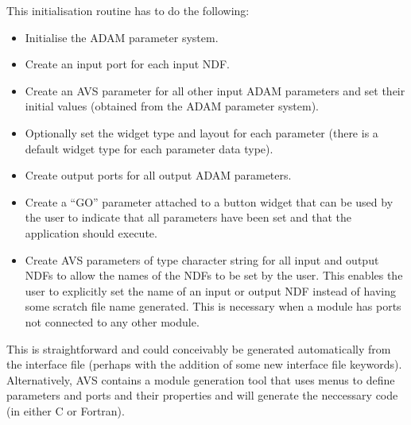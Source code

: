 This initialisation routine has to do the following:
\begin{itemize}

\item Initialise the ADAM parameter system.

\item Create an input port for each input NDF.

\item Create an AVS parameter for all other input ADAM parameters and set their
  initial values (obtained from the ADAM parameter system).

\item Optionally set the widget type and layout for each parameter (there is a
  default widget type for each parameter data type).

\item Create output ports for all output ADAM parameters.

\item Create a ``GO'' parameter attached to a button widget that can be used by the
  user to indicate that all parameters have been set and that the application
  should execute.

\item Create AVS parameters of type character string for all input and output NDFs
  to allow the names of the NDFs to be set by the user. This enables the user
  to explicitly set the name of an input or output NDF instead of having some
  scratch file name generated. This is necessary when a module has ports not
  connected to any other module.

\end{itemize}
This is straightforward and could conceivably be generated automatically from
the interface file (perhaps with the addition of some new interface file
keywords). Alternatively, AVS contains a module generation tool that uses menus
to define parameters and ports and their properties and will generate the
neccessary code (in either C or Fortran).

